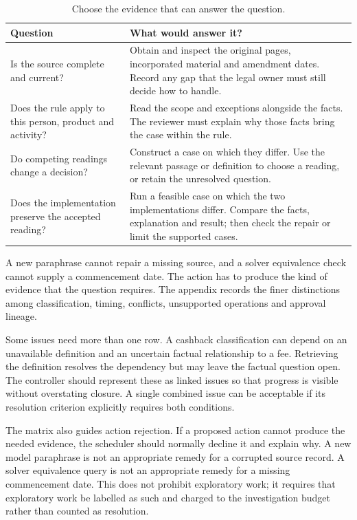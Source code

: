 \begin{table}[H]
\centering
\caption{Choose the evidence that can answer the question.}
\label{tab:resolution-matrix}
\begin{tabularx}{\textwidth}{P{54mm}Y}
\toprule
Question & What would answer it?\\
\midrule
Is the source complete and current? & Obtain and inspect the original pages, incorporated material and amendment dates. Record any gap that the legal owner must still decide how to handle.\\
\addlinespace[0.5em]
Does the rule apply to this person, product and activity? & Read the scope and exceptions alongside the facts. The reviewer must explain why those facts bring the case within the rule.\\
\addlinespace[0.5em]
Do competing readings change a decision? & Construct a case on which they differ. Use the relevant passage or definition to choose a reading, or retain the unresolved question.\\
\addlinespace[0.5em]
Does the implementation preserve the accepted reading? & Run a feasible case on which the two implementations differ. Compare the facts, explanation and result; then check the repair or limit the supported cases.\\
\bottomrule
\end{tabularx}
\end{table}

A new paraphrase cannot repair a missing source, and a solver equivalence check
cannot supply a commencement date. The action has to produce the kind of evidence
that the question requires. The appendix records the finer distinctions among
classification, timing, conflicts, unsupported operations and approval lineage.


Some issues need more than one row. A cashback classification can depend on an
unavailable definition and an uncertain factual relationship to a fee. Retrieving
the definition resolves the dependency but may leave the factual question open.
The controller should represent these as linked issues so that progress is visible
without overstating closure. A single combined issue can be acceptable if its
resolution criterion explicitly requires both conditions.

The matrix also guides action rejection. If a proposed action cannot produce the
needed evidence, the scheduler should normally decline it and explain why. A new
model paraphrase is not an appropriate remedy for a corrupted source record. A
solver equivalence query is not an appropriate remedy for a missing commencement
date. This does not prohibit exploratory work; it requires that exploratory work
be labelled as such and charged to the investigation budget rather than counted
as resolution.

